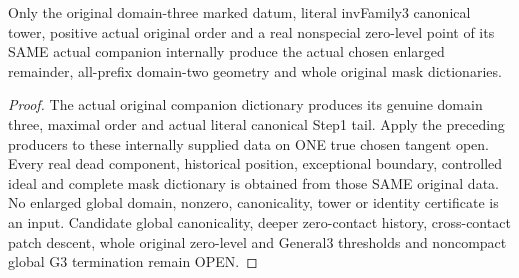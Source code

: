 \begin{theorem}
\label{hir:zero-contact-remainder-original-general-three}
\leanok
{}
Only the original domain-three marked datum, literal invFamily3 canonical
tower, positive actual original order and a real nonspecial zero-level point
of its SAME actual companion internally produce the actual chosen enlarged
remainder, all-prefix domain-two geometry and whole original mask dictionaries.
\end{theorem}
\begin{proof}
The actual original companion dictionary produces its genuine domain three,
maximal order and actual literal canonical Step1 tail. Apply the preceding
producers to these internally supplied data on ONE true chosen tangent open.
Every real dead component, historical position, exceptional boundary,
controlled ideal and complete mask dictionary is obtained from those SAME
original data. No enlarged global domain, nonzero, canonicality, tower or
identity certificate is an input. Candidate global canonicality, deeper
zero-contact history, cross-contact patch descent, whole original zero-level
and General3 thresholds and noncompact global G3 termination remain OPEN.
\end{proof}
